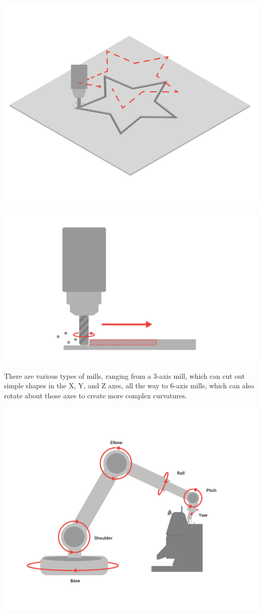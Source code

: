 \begin{center}
    
    \includegraphics[width=.75\textwidth]{millWide.png}
    
    \includegraphics[width=.75\textwidth]{mill1.png}
\end{center}


There are various types of mills, ranging from a 3-axis mill, which can cut out simple shapes in the X, Y, and Z axes, all the way to 6-axis mills, which can also rotate about those axes to create more complex curvatures.
\begin{center}
    
    \includegraphics[width=.75\textwidth]{sixAxisCnc.png}
\end{center}


